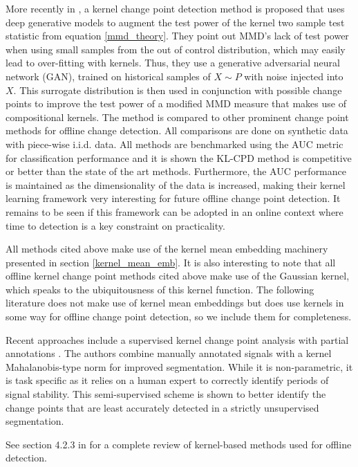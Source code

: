 More recently in \cite{chang2019kernel}, a  kernel change point detection method is proposed that uses deep generative models to augment the test power of the kernel two sample test statistic from equation \ref{mmd_theory}. They point out MMD's lack of test power when using small samples from the out of control distribution, which may easily lead to over-fitting with kernels. Thus, they use a generative adversarial neural network (GAN), trained on historical samples of $X \sim  P$  with noise injected into $X$. This surrogate distribution is then used in conjunction with possible change points to improve the test power of a modified MMD measure that makes use of compositional kernels. The method is compared to other prominent change point methods for offline change detection. All comparisons are done on synthetic data with piece-wise i.i.d. data. All methods are benchmarked using the AUC metric for classification performance and it is shown the KL-CPD method is competitive or better than the state of the art methods.  Furthermore, the AUC performance is maintained as the dimensionality of the data is increased, making their kernel learning framework very interesting for future offline change point detection. It remains to be seen if this framework can be adopted in an online context where time to detection is a key constraint on practicality.

All methods cited above make use of the kernel mean embedding machinery presented in section \ref{kernel_mean_emb}. It is also interesting to note that all offline kernel change point methods cited above make use of the Gaussian kernel, which speaks to the ubiquitousness of this kernel function. The following literature does not make use of kernel mean embeddings but does use kernels in some way for offline change point detection, so we include them for completeness.

Recent approaches include a supervised kernel change point analysis with partial annotations \cite{truong2019supervised}. The authors combine manually annotated signals with a kernel Mahalanobis-type norm for improved segmentation. While it is non-parametric, it is task specific as it relies on a human expert to correctly identify periods of signal stability. This semi-supervised scheme is shown to better identify the change points that are least accurately detected in a strictly unsupervised segmentation. %

See section 4.2.3  in \cite{truong2020selective} for a complete review of kernel-based methods used for offline detection. 


